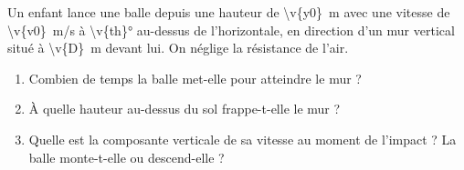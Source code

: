 Un enfant lance une balle depuis une hauteur de \qty{\v{y0}}{m} avec une vitesse de \qty{\v{v0}}{m/s} à \ang{\v{th}} au-dessus de l'horizontale, en direction d'un mur vertical situé à \qty{\v{D}}{m} devant lui. On néglige la résistance de l'air.

\begin{enumerate}[label=\alph*)]
    \item Combien de temps la balle met-elle pour atteindre le mur ?
    \item À quelle hauteur au-dessus du sol frappe-t-elle le mur ?
    \item Quelle est la composante verticale de sa vitesse au moment de l'impact ? La balle monte-t-elle ou descend-elle ?
\end{enumerate}
